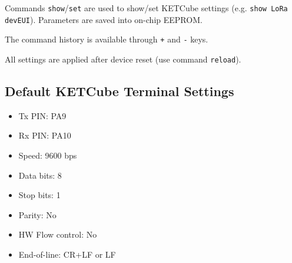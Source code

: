 \documentclass[twoside,a4paper]{refart}
\begin{document}
Commands {\tt show}/{\tt set} are used to show/set KETCube settings (e.g. {\tt show LoRa devEUI}). Parameters are saved into on-chip EEPROM.

The command history is available through {\tt +} and {\tt -} keys.

All settings are applied after device reset (use command {\tt reload}).


\clearpage 

\subsection{Default KETCube Terminal Settings}

\begin{itemize}
  \item Tx PIN: PA9
  \item Rx PIN: PA10
  \item Speed: 9600 bps
  \item Data bits: 8
  \item Stop bits: 1
  \item Parity: No
  \item HW Flow control: No
  \item End-of-line: CR+LF or LF
\end{itemize}






\clearpage





\end{document}
